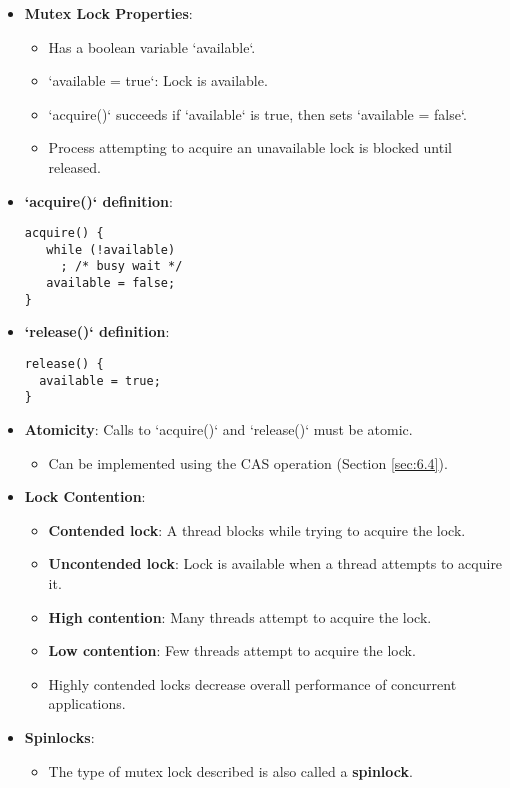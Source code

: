 \begin{itemize}
\begin{verbatim}
}
\end{verbatim}
    \item \textbf{Mutex Lock Properties}:
    \begin{itemize}
        \item Has a boolean variable `available`.
        \item `available = true`: Lock is available.
        \item `acquire()` succeeds if `available` is true, then sets `available = false`.
        \item Process attempting to acquire an unavailable lock is blocked until released.
    \end{itemize}
    \item \textbf{`acquire()` definition}:
\begin{verbatim}
acquire() {
   while (!available)
     ; /* busy wait */
   available = false;
}
\end{verbatim}
    \item \textbf{`release()` definition}:
\begin{verbatim}
release() {
  available = true;
}
\end{verbatim}
    \item \textbf{Atomicity}: Calls to `acquire()` and `release()` must be atomic.
    \begin{itemize}
        \item Can be implemented using the CAS operation (Section \ref{sec:6.4}).
    \end{itemize}
    \item \textbf{Lock Contention}:
    \begin{itemize}
        \item \textbf{Contended lock}: A thread blocks while trying to acquire the lock.
        \item \textbf{Uncontended lock}: Lock is available when a thread attempts to acquire it.
        \item \textbf{High contention}: Many threads attempt to acquire the lock.
        \item \textbf{Low contention}: Few threads attempt to acquire the lock.
        \item Highly contended locks decrease overall performance of concurrent applications.
    \end{itemize}
    \item \textbf{Spinlocks}:
    \begin{itemize}
        \item The type of mutex lock described is also called a \textbf{spinlock}.

\end{itemize}
\end{itemize}
